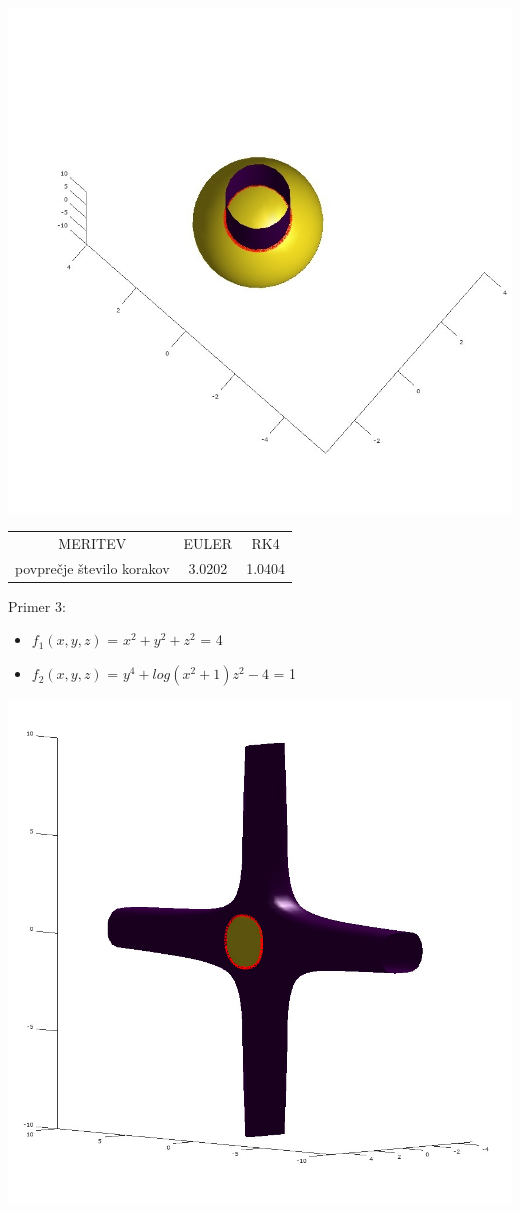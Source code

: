\documentclass[]{article}
\begin{document}
	\includegraphics[scale=0.3]{primer2_2}
	\begin{center}
	\begin{tabular}{ |c|c|c| } 
 		\hline
 			MERITEV & EULER & RK4 \\ 
			povpre\v{c}je \v{s}tevilo korakov & 3.0202 & 1.0404 \\ 
 		\hline
 	\end{tabular}
	\end{center}
	Primer 3:
	\begin{itemize}  
		\item $f_{1}(x,y,z)$ = $x^2 + y^2 + z^2$ = 4
		\item $f_{2}(x,y,z)$ = $y^4 + log(x^2 + 1)z^2 - 4$ = 1
	\end{itemize}
	\includegraphics[scale=0.3]{primer3_1}
\end{document}
